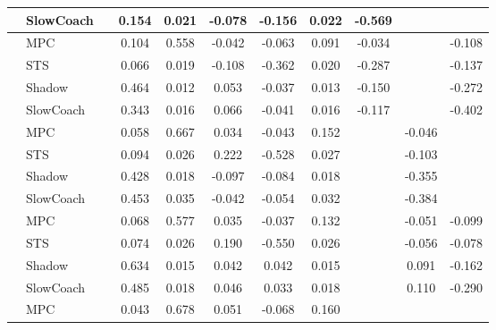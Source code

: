 \begin{tabular}{|l|l|*{9}{c|}}
                                                           & SlowCoach &       &     0.154 &     0.021 & -0.078 & -0.156 &  0.022 &  -0.569 &      &       \\
\midrule
[False, True, True, True, True, True, True, False, True] & MPC &       &     0.104 &     0.558 & -0.042 & -0.063 &  0.091 &  -0.034 &      &   -0.108 \\
                                                           & STS &       &     0.066 &     0.019 & -0.108 & -0.362 &  0.020 &  -0.287 &      &   -0.137 \\
                                                           & Shadow &       &     0.464 &     0.012 &  0.053 & -0.037 &  0.013 &  -0.150 &      &   -0.272 \\
                                                           & SlowCoach &       &     0.343 &     0.016 &  0.066 & -0.041 &  0.016 &  -0.117 &      &   -0.402 \\
\midrule
[False, True, True, True, True, True, False, True, False] & MPC &       &     0.058 &     0.667 &  0.034 & -0.043 &  0.152 &      &  -0.046 &       \\
                                                           & STS &       &     0.094 &     0.026 &  0.222 & -0.528 &  0.027 &      &  -0.103 &       \\
                                                           & Shadow &       &     0.428 &     0.018 & -0.097 & -0.084 &  0.018 &      &  -0.355 &       \\
                                                           & SlowCoach &       &     0.453 &     0.035 & -0.042 & -0.054 &  0.032 &      &  -0.384 &       \\
\midrule
[False, True, True, True, True, True, False, True, True] & MPC &       &     0.068 &     0.577 &  0.035 & -0.037 &  0.132 &      &  -0.051 &   -0.099 \\
                                                           & STS &       &     0.074 &     0.026 &  0.190 & -0.550 &  0.026 &      &  -0.056 &   -0.078 \\
                                                           & Shadow &       &     0.634 &     0.015 &  0.042 &  0.042 &  0.015 &      &   0.091 &   -0.162 \\
                                                           & SlowCoach &       &     0.485 &     0.018 &  0.046 &  0.033 &  0.018 &      &   0.110 &   -0.290 \\
\midrule
[False, True, True, True, True, True, False, False, False] & MPC &       &     0.043 &     0.678 &  0.051 & -0.068 &  0.160 &      &      &       \\

\end{tabular}
